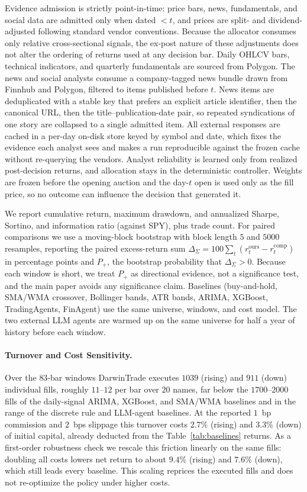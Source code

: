 \documentclass[letterpaper]{article}
\begin{document}
Evidence admission is strictly point-in-time: price bars, news, fundamentals, and
social data are admitted only when dated ${<}t$, and prices are split- and
dividend-adjusted following standard vendor conventions. Because the allocator
consumes only relative cross-sectional signals, the ex-post nature of these
adjustments does not alter the ordering of returns used at any decision bar.
Daily OHLCV bars, technical indicators, and quarterly
fundamentals are sourced from Polygon. The news and social analysts consume a
company-tagged news bundle drawn from Finnhub and Polygon, filtered to items
published before $t$. News items are deduplicated with a stable key that prefers an
explicit article identifier, then the canonical URL, then the
title--publication-date pair, so repeated syndications of one story are collapsed to
a single admitted item. All external responses are cached in a per-day on-disk store
keyed by symbol and date, which fixes the evidence each analyst sees and makes a run
reproducible against the frozen cache without re-querying the vendors. Analyst
reliability is learned only from realized post-decision returns, and allocation stays in
the deterministic controller. Weights are frozen before the opening auction and the
day-$t$ open is used only as the fill price, so no outcome can influence the
decision that generated it.

We report cumulative return, maximum drawdown, and annualized Sharpe, Sortino, and
information ratio (against SPY), plus trade count. For paired comparisons we use a
moving-block bootstrap \citep{kuensch1989jackknife} with block length $5$ and
$5000$ resamples, reporting the paired excess-return sum
$\Delta_\Sigma=100\sum_t(r^{\text{ours}}_t-r^{\text{comp}}_t)$ in percentage points
and $P_+$, the bootstrap probability that $\Delta_\Sigma>0$. Because each window is
short, we treat $P_+$ as directional evidence, not a significance test, and
the main paper avoids any significance claim. Baselines (buy-and-hold, SMA/WMA
crossover, Bollinger bands, ATR bands, ARIMA, XGBoost, TradingAgents, FinAgent) use
the same universe, windows, and cost model. The two external LLM agents are warmed
up on the same universe for half a year of history before each window.

\paragraph{Turnover and Cost Sensitivity.}
Over the $83$-bar windows DarwinTrade executes $1039$ (rising) and $911$ (down)
individual fills, roughly $11$--$12$ per bar over $20$ names, far below the
$1700$--$2000$ fills of the daily-signal ARIMA, XGBoost, and SMA/WMA baselines and
in the range of the discrete rule and LLM-agent baselines. At the reported $1$~bp
commission and $2$~bps slippage this turnover costs $2.7\%$ (rising) and $3.3\%$
(down) of initial capital, already deducted from the Table~\ref{tab:baselines}
returns. As a first-order robustness check we rescale this friction linearly on the
same fills: doubling all costs lowers net return to about $9.4\%$ (rising) and
$7.6\%$ (down), which still leads every baseline. This scaling reprices the executed
fills and does not re-optimize the policy under higher costs.
\end{document}
